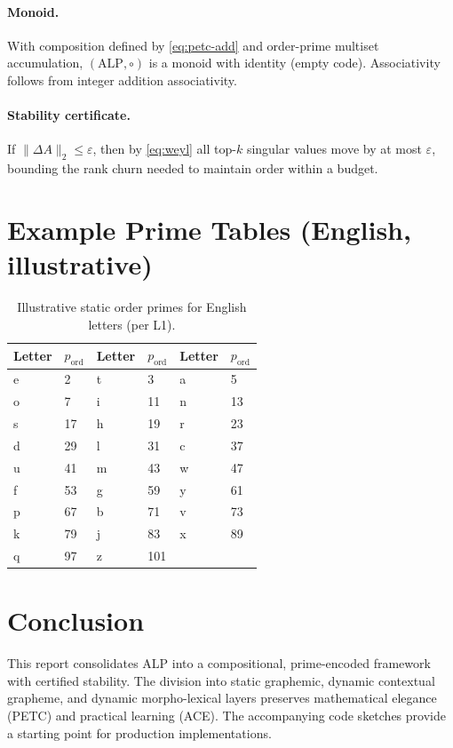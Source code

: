 \documentclass[11pt]{article}
\begin{document}
\paragraph{Monoid.} With composition defined by \eqref{eq:petc-add} and order-prime multiset accumulation, $(\text{ALP},\circ)$ is a monoid with identity (empty code). Associativity follows from integer addition associativity.

\paragraph{Stability certificate.} If $\|\Delta A\|_2\le\varepsilon$, then by \eqref{eq:weyl} all top-$k$ singular values move by at most $\varepsilon$, bounding the rank churn needed to maintain order within a budget.

\section{Example Prime Tables (English, illustrative)}
\begin{table}[h]
\centering
\small
\begin{tabular}{ll|ll|ll}
\toprule
Letter & $p_\text{ord}$ & Letter & $p_\text{ord}$ & Letter & $p_\text{ord}$ \\
\midrule
 e & 2 & t & 3 & a & 5 \\
 o & 7 & i & 11 & n & 13 \\
 s & 17 & h & 19 & r & 23 \\
 d & 29 & l & 31 & c & 37 \\
 u & 41 & m & 43 & w & 47 \\
 f & 53 & g & 59 & y & 61 \\
 p & 67 & b & 71 & v & 73 \\
 k & 79 & j & 83 & x & 89 \\
 q & 97 & z & 101 &  &  \\
\bottomrule
\end{tabular}
\caption{Illustrative static order primes for English letters (per L1).}
\end{table}

\section{Conclusion}
This report consolidates ALP into a compositional, prime-encoded framework with certified stability. The division into static graphemic, dynamic contextual grapheme, and dynamic morpho-lexical layers preserves mathematical elegance (PETC) and practical learning (ACE). The accompanying code sketches provide a starting point for production implementations.
\end{document}

